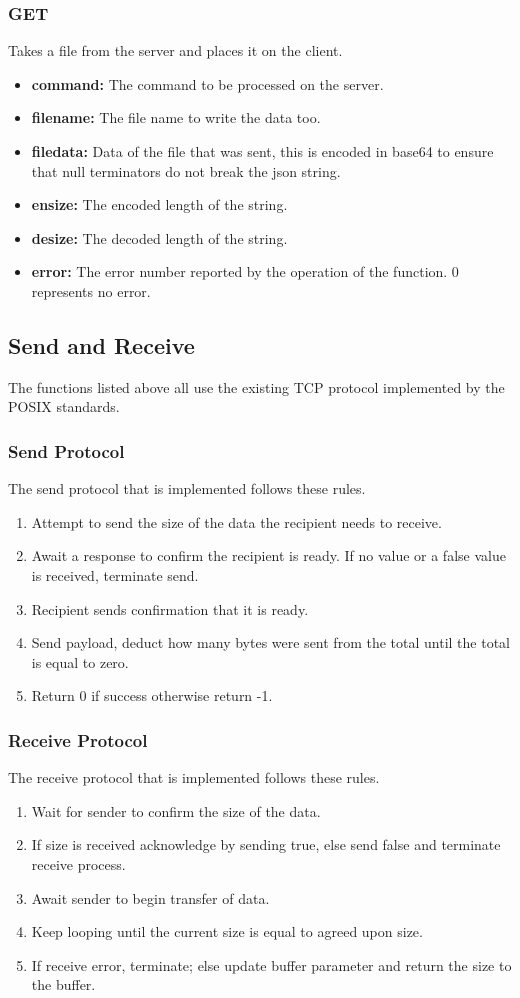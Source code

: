 \documentclass{article}
\begin{document}
\subsubsection{GET}
Takes a file from the server and places it on the client.
\begin{itemize}
\item \textbf{command:} The command to be processed on the server.
\item \textbf{filename:} The file name to write the data too.
\item \textbf{filedata:} Data of the file that was sent, this is encoded in base64 to ensure that null terminators do not break the json string.
\item \textbf{ensize:} The encoded length of the string.
\item \textbf{desize:} The decoded length of the string.
\item \textbf{error:} The error number reported by the operation of the function. 0 represents no error.
\end{itemize}
\subsection{Send and Receive}
The functions listed above all use the existing TCP protocol implemented by the POSIX standards.
\subsubsection{Send Protocol}
The send protocol that is implemented follows these rules.
\begin{enumerate}
    \item Attempt to send the size of the data the recipient needs to receive.
    \item Await a response to confirm the recipient is ready. If no value or a false value is received, terminate send.
    \item Recipient sends confirmation that it is ready.
    \item Send payload, deduct how many bytes were sent from the total until the total is equal to zero.
    \item Return 0 if success otherwise return -1.
\end{enumerate}
\subsubsection{Receive Protocol}
The receive protocol that is implemented follows these rules.
\begin{enumerate}
    \item Wait for sender to confirm the size of the data.
    \item If size is received acknowledge by sending true, else send false and terminate receive process.
    \item Await sender to begin transfer of data.
    \item Keep looping until the current size is equal to agreed upon size.
    \item If receive error, terminate; else update buffer parameter and return the size to the buffer.
\end{enumerate}
\end{document}
